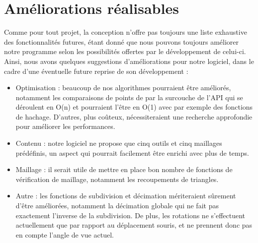 \documentclass[a4paper]{memoir}
\begin{document}
		\section{Améliorations réalisables}
			Comme pour tout projet, la conception n'offre pas toujours une liste exhaustive des fonctionnalités futures, étant donné que nous pouvons 
			toujours améliorer notre programme selon les possibilités offertes par le développement de celui-ci. Ainsi, nous avons quelques suggestions 
			d'améliorations pour notre logiciel, dans le cadre d'une éventuelle future reprise de son développement :
			\begin{itemize}
				\item Optimisation : beaucoup de nos algorithmes pourraient être améliorés, notamment les comparaisons de points de par la surcouche de 
				l'API qui se déroulent en O(n) et pourraient l'être en O(1) avec par exemple des fonctions de hachage. D'autres, plus coûteux, 
				nécessiteraient une recherche approfondie pour améliorer les performances.
				\item Contenu : notre logiciel ne propose que cinq outils et cinq maillages prédéfinis, un aspect qui pourrait facilement être enrichi 
				avec plus de temps.
				\item Maillage : il serait utile de mettre en place bon nombre de fonctions de vérification de maillage, notamment les recoupements de 
				triangles.
				\item Autre : les fonctions de subdivision et décimation mériteraient sûrement d'être améliorées, notamment la décimation globale qui ne
				fait pas exactement l'inverse de la subdivision. De plus, les rotations ne s'effectuent actuellement que par rapport au déplacement souris,
				et ne prennent donc pas en compte l'angle de vue actuel.
			\end{itemize}

\end{document}
